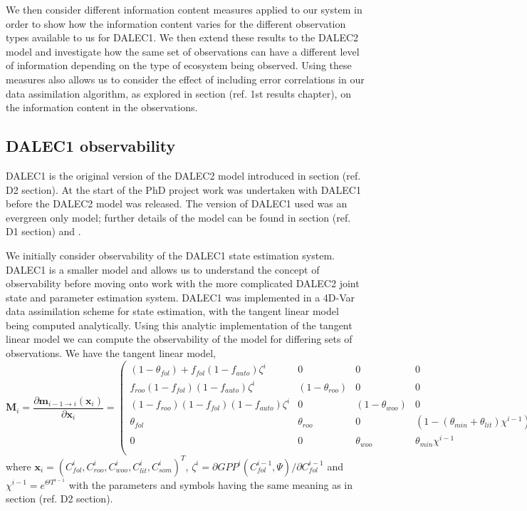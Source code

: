 \documentclass[11pt]{article}
\begin{document}
We then consider different information content measures applied to our system in order to show how the information content varies for the different observation types available to us for DALEC1. We then extend these results to the DALEC2 model and investigate how the same set of observations can have a different level of information depending on the type of ecosystem being observed. Using these measures also allows us to consider the effect of including error correlations in our data assimilation algorithm, as explored in section ({\color{red}ref. 1st results chapter}), on the information content in the observations.

\subsection{DALEC1 observability} \label{sec:D1observability}

DALEC1 is the original version of the DALEC2 model introduced in section ({\color{red}ref. D2 section}). At the start of the PhD project work was undertaken with DALEC1 before the DALEC2 model was released. The version of DALEC1 used was an evergreen only model; further details of the model can be found in section ({\color{red}ref. D1 section}) and \citet{williams2005improved}. 

We initially consider observability of the DALEC1 state estimation system. DALEC1 is a smaller model and allows us to understand the concept of observability before moving onto work with the more complicated DALEC2 joint state and parameter estimation system. DALEC1 was implemented in a 4D-Var data assimilation scheme for state estimation, with the tangent linear model being computed analytically. Using this analytic implementation of the tangent linear model we can compute the observability of the model for differing sets of observations. We have the tangent linear model,
\begin{dmath}
\mathbf{M}_{i} = \frac{\partial \textbf{m}_{i-1\rightarrow i}(\textbf{x}_{i})}{\partial \textbf{x}_{i}} = 
\begin{pmatrix}  
(1-\theta_{fol})+f_{fol}(1-f_{auto})\zeta^i & 0 & 0 & 0 & 0 \\
f_{roo}(1-f_{fol})(1-f_{auto})\zeta^i & (1-\theta_{roo}) & 0 & 0 & 0 \\
(1-f_{roo})(1-f_{fol})(1-f_{auto})\zeta^i & 0 & (1-\theta_{woo}) & 0 & 0 \\
\theta_{fol} & \theta_{roo} & 0 & (1-(\theta_{min}+\theta_{lit})\chi^{i-1}) & 0 \\
0 & 0 & \theta_{woo} & \theta_{min}\chi^{i-1} & (1-\theta_{som}\chi^{i-1}) \\
\end{pmatrix}, \label{eqn:linmod}
\end{dmath}
where \(\textbf{x}_{i}=(C_{fol}^{i}, C_{roo}^{i}, C_{woo}^{i}, C_{lit}^{i}, C_{som}^{i})^{T}\), \(\zeta^i = \partial GPP^{i}(C_{fol}^{i-1}, \Psi)/\partial C_{fol}^{i-1}\) and \(\chi^{i-1}=e^{\Theta T^{i-1}}\) with the parameters and symbols having the same meaning as in section ({\color{red}ref. D2 section}). 
\end{document}
